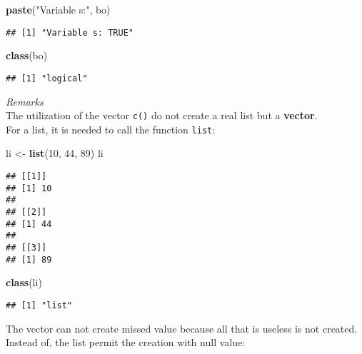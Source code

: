 \documentclass[
]{article}
\newenvironment{Shaded}{\begin{snugshade}}{\end{snugshade}}
\newcommand{\DecValTok}[1]{\textcolor[rgb]{0.00,0.00,0.81}{#1}}
\newcommand{\FunctionTok}[1]{\textcolor[rgb]{0.13,0.29,0.53}{\textbf{#1}}}
\newcommand{\NormalTok}[1]{#1}
\newcommand{\OtherTok}[1]{\textcolor[rgb]{0.56,0.35,0.01}{#1}}
\newcommand{\StringTok}[1]{\textcolor[rgb]{0.31,0.60,0.02}{#1}}
\begin{document}
\begin{Shaded}
\begin{Highlighting}[]
\FunctionTok{paste}\NormalTok{(}\StringTok{"Variable s:"}\NormalTok{, bo)}
\end{Highlighting}
\end{Shaded}

\begin{verbatim}
## [1] "Variable s: TRUE"
\end{verbatim}

\begin{Shaded}
\begin{Highlighting}[]
\FunctionTok{class}\NormalTok{(bo)}
\end{Highlighting}
\end{Shaded}

\begin{verbatim}
## [1] "logical"
\end{verbatim}

\emph{Remarks}\\
The utilization of the vector \texttt{c()} do not create a real list but
a \textbf{vector}.\\
For a list, it is needed to call the function \texttt{list}:

\begin{Shaded}
\begin{Highlighting}[]
\NormalTok{li }\OtherTok{\textless{}{-}} \FunctionTok{list}\NormalTok{(}\DecValTok{10}\NormalTok{, }\DecValTok{44}\NormalTok{, }\DecValTok{89}\NormalTok{)}
\NormalTok{li}
\end{Highlighting}
\end{Shaded}

\begin{verbatim}
## [[1]]
## [1] 10
## 
## [[2]]
## [1] 44
## 
## [[3]]
## [1] 89
\end{verbatim}

\begin{Shaded}
\begin{Highlighting}[]
\FunctionTok{class}\NormalTok{(li)}
\end{Highlighting}
\end{Shaded}

\begin{verbatim}
## [1] "list"
\end{verbatim}

The vector can not create missed value because all that is useless is
not created. Instead of, the list permit the creation with null value:
\end{document}
